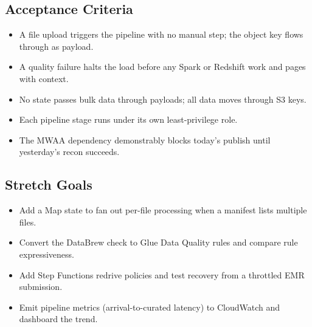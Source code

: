\subsection*{Acceptance Criteria}
\begin{itemize}
    \item A file upload triggers the pipeline with no manual step; the object key flows through as payload.
    \item A quality failure halts the load before any Spark or Redshift work and pages with context.
    \item No state passes bulk data through payloads; all data moves through S3 keys.
    \item Each pipeline stage runs under its own least-privilege role.
    \item The MWAA dependency demonstrably blocks today's publish until yesterday's recon succeeds.
\end{itemize}

\subsection*{Stretch Goals}
\begin{itemize}
    \item Add a Map state to fan out per-file processing when a manifest lists multiple files.
    \item Convert the DataBrew check to Glue Data Quality rules and compare rule expressiveness.
    \item Add Step Functions redrive policies and test recovery from a throttled EMR submission.
    \item Emit pipeline metrics (arrival-to-curated latency) to CloudWatch and dashboard the trend.
\end{itemize}

